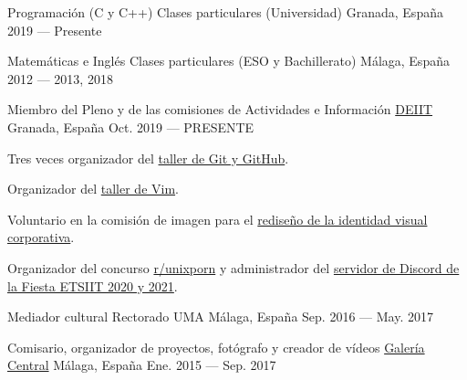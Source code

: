 
\begin{cventries}

\cventry%
	{Programación (C y C++)}
	{Clases particulares (Universidad)}
	{Granada, España}
	{2019 --- Presente}
	{}

\cventry%
	{Matemáticas e Inglés}
	{Clases particulares (ESO y Bachillerato)}
	{Málaga, España}
	{2012 --- 2013, 2018}
	{}

\cventry%
	{Miembro del Pleno y de las comisiones de Actividades e Información} %
	{\href{https://deiit.ugr.es/}{DEIIT}} %
	{Granada, España} %
	{Oct. 2019 --- PRESENTE} %
	{%
		\begin{cvitems} %
			\item
				Tres veces organizador del \href{https://github.com/DEIIT/taller-git-y-github}{taller de Git y GitHub}.
			\item
				Organizador del \href{https://deiit.ugr.es/vim-oct-2020/}{taller de Vim}.
			\item
				Voluntario en la comisión de imagen para el \href{https://deiit.ugr.es/transparencia/\#manual-de-identidad-visual-corporativa}{rediseño de la identidad visual corporativa}.
			\item
				Organizador del concurso \href{https://www.reddit.com/r/unixporn/}{r/unixporn} y administrador del \href{https://deiit.ugr.es/fiesta_2020/}{servidor de Discord de la Fiesta ETSIIT 2020 y 2021}.
		\end{cvitems}
	}

\cventry%
	{Mediador cultural} %
	{Rectorado UMA} %
	{Málaga, España} %
	{Sep. 2016 --- May. 2017} %
	{}

\cventry%
	{Comisario, organizador de proyectos, fotógrafo y creador de vídeos}
	{\href{https://twitter.com/galeriacentral}{Galería Central}}
	{Málaga, España}
	{Ene. 2015 --- Sep. 2017}
	{}
\end{cventries}
